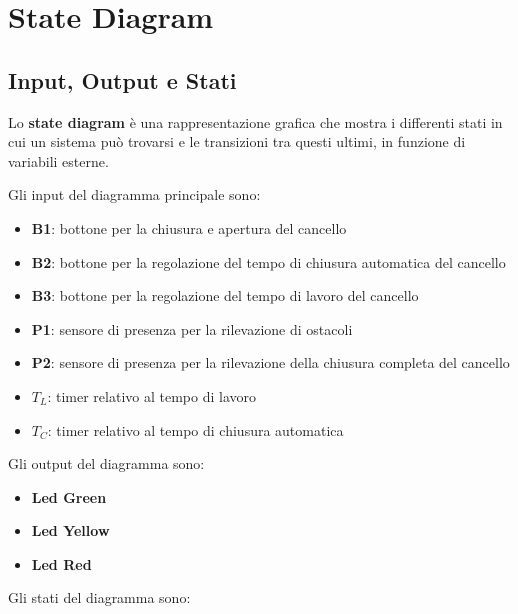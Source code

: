 \chapter{\bf{State Diagram}}
\boldmath

\section{Input, Output e Stati}

Lo \textbf{state diagram} è una rappresentazione grafica che mostra i differenti stati in cui un sistema può trovarsi e le transizioni tra questi ultimi, in funzione di variabili esterne.

\vspace{3mm}

\noindent Gli input del diagramma principale sono:

\begin{itemize}
    \item \textbf{B1}: bottone per la chiusura e apertura del cancello
    \item \textbf{B2}: bottone per la regolazione del tempo di chiusura automatica del cancello
    \item \textbf{B3}: bottone per la regolazione del tempo di lavoro del cancello
    \item \textbf{P1}: sensore di presenza per la rilevazione di ostacoli
    \item \textbf{P2}: sensore di presenza per la rilevazione della chiusura completa del cancello
    \item $T_L$: timer relativo al tempo di lavoro
    \item $T_C$: timer relativo al tempo di chiusura automatica
\end{itemize}

\noindent Gli output del diagramma sono:

\begin{itemize}
    \item \textbf{Led Green}
    \item \textbf{Led Yellow}
    \item \textbf{Led Red}
\end{itemize}

\noindent Gli stati del diagramma sono:

